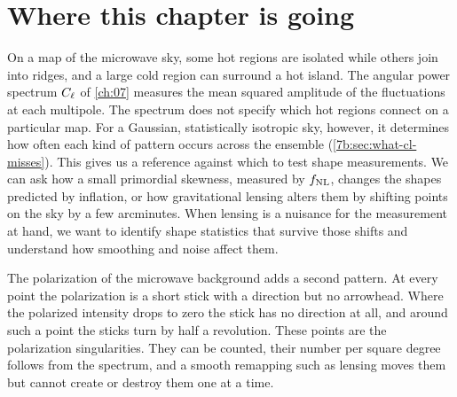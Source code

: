 \section*{Where this chapter is going}
\label{T3a:sec:roadmap}

On a map of the microwave sky, some hot regions are isolated while others join into ridges, and a large cold region can surround a hot island. The angular power spectrum $C_\ell$ of \cref{ch:07} measures the mean squared amplitude of the fluctuations at each multipole. The spectrum does not specify which hot regions connect on a particular map. For a Gaussian, statistically isotropic sky, however, it determines how often each kind of pattern occurs across the ensemble (\cref{7b:sec:what-cl-misses}). This gives us a reference against which to test shape measurements. We can ask how a small primordial skewness, measured by $f_{\rm NL}$, changes the shapes predicted by inflation, or how gravitational lensing alters them by shifting points on the sky by a few arcminutes. When lensing is a nuisance for the measurement at hand, we want to identify shape statistics that survive those shifts and understand how smoothing and noise affect them.

The polarization of the microwave background adds a second pattern. At every point the polarization is a short stick with a direction but no arrowhead. Where the polarized intensity drops to zero the stick has no direction at all, and around such a point the sticks turn by half a revolution. These points are the polarization singularities. They can be counted, their number per square degree follows from the spectrum, and a smooth remapping such as lensing moves them but cannot create or destroy them one at a time.

